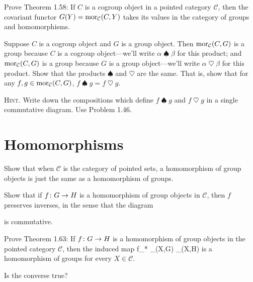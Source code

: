 \bs
\es

\addtocounter{exercise}{1}
\bp
Prove Theorem 1.58: If $C$ is a cogroup object in a pointed category $\mathcal{C}$, then the covariant functor $G(Y) = \operatorname{mor}_{\mathcal{C}}(C,Y)$ takes its values in the category of groups and homomorphisms.
\ep

\bs
\es

\bp
Suppose $C$ is a cogroup object and $G$ is a group object. Then $\operatorname{mor}_{\mathcal{C}}(C,G)$ is a group because $C$ is a cogroup object---we'll write $\alpha\mathbin{\spadesuit} \beta$ for this product; and $\operatorname{mor}_{\mathcal{C}}(C,G)$ is a group because $G$ is a group object---we'll write $\alpha\mathbin{\heartsuit}\beta$ for this product. Show that the products $\mathbin{\spadesuit}$ and $\mathbin{\heartsuit}$ are the same. That is, show that for any $f, g \in\operatorname{mor}_{\mathcal{C}}(C,G)$, $f\mathbin{\spadesuit} g=f\mathbin{\heartsuit} g$.

{\scshape Hint}. Write down the compositions which define $f\mathbin{\spadesuit} g$ and $f\mathbin{\heartsuit} g$ in a single commutative diagram. Use Problem 1.46.
\ep

\bs
\es

\section{Homomorphisms}

\bx
Show that when $\mathcal{C}$ is the category of pointed sets, a homomorphism of group objects is just the same as a homomorphism of groups.
\ex

\bs
\es

\bx
Show that if $f \colon G \to H$ is a homomorphism of group objects in $\mathcal{C}$, then $f$ preserves inverses, in the sense that the diagram
\bse
{}
\ese
is commutative.
\ex

\bs
\es

\addtocounter{exercise}{1}

\bp
Prove Theorem 1.63: If $f \colon G \to H$ is a homomorphism of group objects in the pointed category $\mathcal{C}$, then the induced map
\bse
f_* \cl \mor_{}(X,G) \longrightarrow \mor_{}(X,H)
\ese
is a homomorphism of groups for every $X \in\mathcal{C}$.

Is the converse true?
\ep

